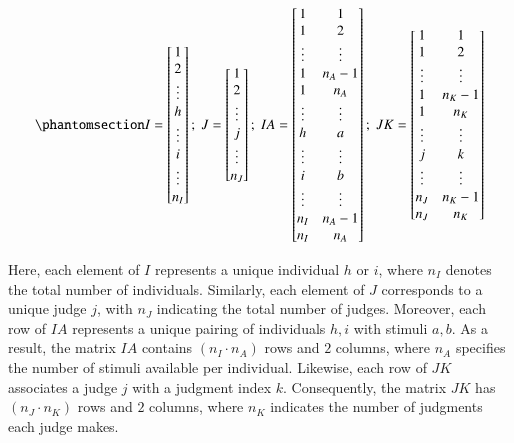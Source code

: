 \documentclass[
  authoryear,
  review,
  1p]{elsarticle}
\begin{document}
\begin{equation}\phantomsection\label{eq-mat11}{
I = \begin{bmatrix}
1 \\
2 \\
\vdots \\
h \\
\vdots \\
i \\
\vdots \\
n_{I}
\end{bmatrix} ; \;
J = \begin{bmatrix}
1 \\
2 \\
\vdots \\
j \\
\vdots \\
n_{J}
\end{bmatrix} ; \;
IA = \begin{bmatrix}
1 & 1 \\
1 & 2 \\
\vdots & \vdots \\
1 & n_{A}-1 \\
1 & n_{A} \\
\vdots & \vdots \\
h & a \\
\vdots & \vdots \\
i & b \\
\vdots & \vdots \\
n_{I} & n_{A}-1 \\
n_{I} & n_{A} \\
\end{bmatrix} ; \;
JK = \begin{bmatrix}
1 & 1 \\
1 & 2 \\
\vdots & \vdots \\
1 & n_{K}-1 \\
1 & n_{K} \\
\vdots & \vdots \\
j & k \\
\vdots & \vdots \\
n_{J} & n_{K}-1 \\
n_{J} & n_{K} \\
\end{bmatrix}
}\end{equation}

Here, each element of \(I\) represents a unique individual \(h\) or
\(i\), where \(n_{I}\) denotes the total number of individuals.
Similarly, each element of \(J\) corresponds to a unique judge \(j\),
with \(n_{J}\) indicating the total number of judges. Moreover, each row
of \(IA\) represents a unique pairing of individuals \(h, i\) with
stimuli \(a, b\). As a result, the matrix \(IA\) contains
\((n_{I} \cdot n_{A})\) rows and \(2\) columns, where \(n_{A}\)
specifies the number of stimuli available per individual. Likewise, each
row of \(JK\) associates a judge \(j\) with a judgment index \(k\).
Consequently, the matrix \(JK\) has \((n_{J} \cdot n_{K})\) rows and
\(2\) columns, where \(n_{K}\) indicates the number of judgments each
judge makes.
\end{document}
